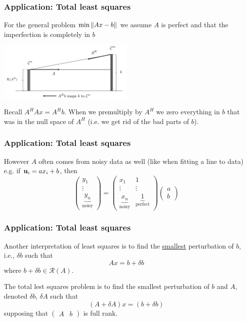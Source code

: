 \documentclass{beamer}
\begin{document}
\begin{frame}\frametitle{Application:  Total least squares}
	For the general problem $\min \left\|Ax - b\right\|$ we assume $A$ is perfect and that the imperfection is completely in $b$
	\begin{center}
		\includegraphics[width=0.5\textwidth]{figures/chap7_svd_2}
	\end{center}
	Recall $A^HAx = A^Hb$.  When we premultiply by $A^H$ we zero everything in $b$ that was in the null space of $A^H$ (i.e. we get rid of the bad parts of $b$).	
\end{frame}

\begin{frame}\frametitle{Application:  Total least squares}
	However $A$ often comes from noisy data as well (like when fitting a line to data) e.g. if $\mathbf{u}_i = ax_i+b$, then
	\[ 
		\begin{pmatrix}
	    	y_1\\
	    	\vdots\\
	    	\underbrace{y_n}_{\text{noisy}}
	  	\end{pmatrix} 
	  	= \begin{pmatrix}
	    	x_1 & 1\\
	    	\vdots & \vdots \\
	    	\underbrace{x_n}_{\text{noisy}} 
	    	& \underbrace{1}_{\text{perfect}}
	  	  \end{pmatrix}
	  	  \begin{pmatrix}
	    	a\\b
	  	  \end{pmatrix}
	\]	
\end{frame}

\begin{frame}\frametitle{Application:  Total least squares}
	Another interpretation of least squares is to find the \underline{smallest} perturbation of $b$, i.e., $\delta b$ such that
	\[ 
		Ax = b + \delta b 
	\] 
	where $b + \delta b \in \mathcal{R}(A)$.
	
	\vfill
	
	The total lest squares problem is to find the smallest perturbation of $b$ and $A$, denoted $\delta b$, $\delta A$ such that
	\[ 
		(A + \delta A)x = (b + \delta b) 
	\]
	supposing that $\begin{pmatrix} A & b \end{pmatrix}$ is full rank.
\end{frame}
\end{document}
